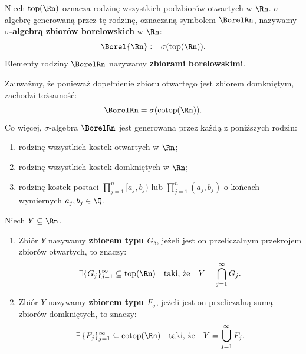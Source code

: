 \begin{defi}
    Niech $\mathrm{top}(\Rn)$ oznacza rodzinę wszystkich podzbiorów otwartych w $\Rn$. $\sigma$-algebrę generowaną przez tę rodzinę, oznaczaną symbolem $\BorelRn$, nazywamy \textbf{$\sigma$-algebrą zbiorów borelowskich} w $\Rn$:
    \begin{equation*}
        \Borel{\Rn} := \sigma(\mathrm{top}(\Rn)).
    \end{equation*}
    Elementy rodziny $\BorelRn$ nazywamy \textbf{zbiorami borelowskimi}.
\end{defi}
\begin{uwaga}
    Zauważmy, że ponieważ dopełnienie zbioru otwartego jest zbiorem domkniętym, zachodzi tożsamość: \begin{equation*} \BorelRn = \sigma(\mathrm{cotop}(\Rn)).
    \end{equation*}
    Co więcej, $\sigma$-algebra $\BorelRn$ jest generowana przez każdą z poniższych rodzin:
    \begin{enumerate}
        \item rodzinę wszystkich kostek otwartych w $\Rn$;
        \item rodzinę wszystkich kostek domkniętych w $\Rn$;
        \item rodzinę kostek postaci $\prod_{j=1}^n [a_j, b_j)$ lub $\prod_{j=1}^n (a_j, b_j)$ o końcach wymiernych $a_j, b_j \in \Q$.
    \end{enumerate}
\end{uwaga}
\begin{defi}
    Niech $Y \subseteq  \Rn$.
    \begin{enumerate}
        \item Zbiór $Y$ nazywamy \textbf{zbiorem typu $G_\delta$}, jeżeli jest on przeliczalnym przekrojem zbiorów otwartych, to znaczy:
              \begin{equation*}
                  \exists \{G_j\}_{j=1}^\infty \subseteq  \mathrm{top}(\Rn) \quad \text{taki, że} \quad Y = \bigcap_{j=1}^\infty G_j.
              \end{equation*}
        \item Zbiór $Y$ nazywamy \textbf{zbiorem typu $F_\sigma$}, jeżeli jest on przeliczalną sumą zbiorów domkniętych, to znaczy:
              \begin{equation*}
                  \exists \, \{F_j\}_{j=1}^\infty \subseteq  \mathrm{cotop}(\Rn) \quad \text{taki, że} \quad Y = \bigcup_{j=1}^\infty F_j.
              \end{equation*}
    \end{enumerate}
\end{defi}
